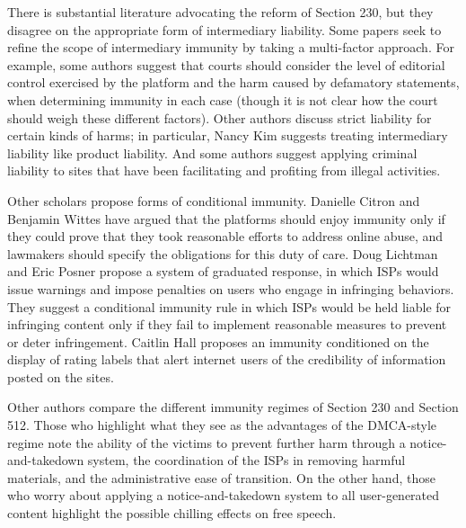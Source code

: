 There is substantial literature advocating the reform of Section 230, but they disagree on the appropriate form of intermediary liability. Some papers seek to refine the scope of intermediary immunity by taking a multi-factor approach. For example, some authors suggest that courts should consider the level of editorial control exercised by the platform and the harm caused by defamatory statements, when determining immunity in each case (though it is not clear how the court should weigh these different factors). Other authors discuss strict liability for certain kinds of harms; in particular, Nancy Kim suggests treating intermediary liability like product liability. And some authors suggest applying criminal liability to sites that have been facilitating and profiting from illegal activities.

Other scholars propose forms of conditional immunity. Danielle Citron and Benjamin Wittes have argued that the platforms should enjoy immunity only if they could prove that they took reasonable efforts to address online abuse, and lawmakers should specify the obligations for this duty of care.  Doug Lichtman and Eric Posner propose a system of graduated response, in which ISPs would issue warnings and impose penalties on users who engage in infringing behaviors. They suggest a conditional immunity rule in which ISPs would be held liable for infringing content only if they fail to implement reasonable measures to prevent or deter infringement. Caitlin Hall proposes an immunity conditioned on the display of rating labels that alert internet users of the credibility of information posted on the sites.

Other authors compare the different immunity regimes of Section 230 and Section 512.  Those who highlight what they see as the advantages of the DMCA-style regime note the ability of the victims to prevent further harm through a notice-and-takedown system, the coordination of the ISPs in removing harmful materials, and the administrative ease of transition.  On the other hand, those who worry about applying a notice-and-takedown system to all user-generated content highlight the possible chilling effects on free speech.


